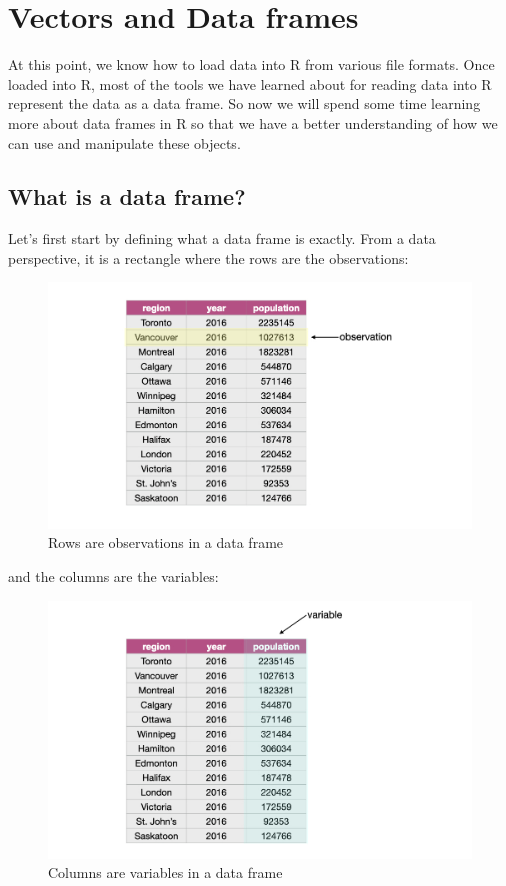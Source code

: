 \documentclass[
]{krantz}
\begin{document}
\hypertarget{vectors-and-data-frames}{%
\section{Vectors and Data frames}\label{vectors-and-data-frames}}

At this point, we know how to load data into R from various file formats. Once loaded into R, most of the tools we have learned about for reading data into R represent the data as a data frame. So now we will spend some time learning more about data frames in R so that we have a better understanding
of how we can use and manipulate these objects.

\hypertarget{what-is-a-data-frame}{%
\subsection{What is a data frame?}\label{what-is-a-data-frame}}

Let's first start by defining what a data frame is exactly. From a data perspective, it is a rectangle where the rows are the observations:

\begin{figure}
\includegraphics[width=1\linewidth]{img/obs} \caption{Rows are observations in a data frame}\label{fig:02-obs}
\end{figure}

and the columns are the variables:

\begin{figure}
\includegraphics[width=1\linewidth]{img/vars} \caption{Columns are variables in a data frame}\label{fig:02-vars}
\end{figure}
\end{document}
